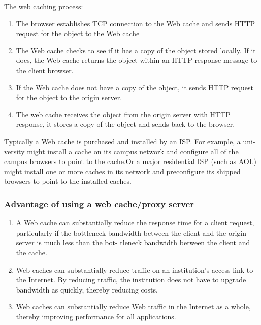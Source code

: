 The web caching process:
\begin{enumerate}
    \item The browser establishes TCP connection to the Web cache and sends HTTP request for the object to the Web cache
    \item The Web cache checks to see if it has a copy of the object stored locally. If it
          does, the Web cache returns the object within an HTTP response message to
          the client browser.
    \item If the Web cache does not have a copy of the object, it sends HTTP request for the object to the origin server.
    \item The web cache receives the object from the origin server with HTTP response, it stores a copy of the object and sends back to the browser.
\end{enumerate}

Typically a Web cache is purchased and installed by an ISP. For example, a uni-
versity might install a cache on its campus network and configure all of the campus
browsers to point to the cache.Or a major residential ISP (such as AOL) might
install one or more caches in its network and preconfigure its shipped browsers to
point to the installed caches.\\

\subsubsection{Advantage of using a web cache/proxy server}

\begin{enumerate}
    \item A Web
          cache can substantially reduce the response time for a client request, particularly if the
          bottleneck bandwidth between the client and the origin server is much less than the bot-
          tleneck bandwidth between the client and the cache.
    \item Web caches can substantially reduce traffic on an institution’s access link to the Internet. By reducing traffic, the institution does not have to upgrade bandwidth as quickly, thereby
          reducing costs.
    \item Web caches can substantially reduce Web traffic in the Internet as a whole, thereby improving performance for all applications.
\end{enumerate}



